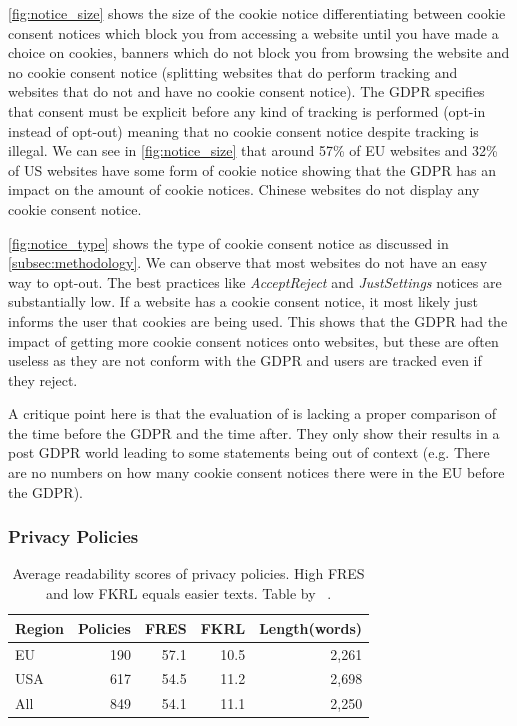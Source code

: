 \autoref{fig:notice_size} shows the size of the cookie notice differentiating between cookie consent notices which block
you from accessing a website until you have made a choice on cookies, banners which do not block you from browsing the
website and no cookie consent notice (splitting websites that do perform tracking and websites that do not and have no
cookie consent notice). The GDPR specifies that consent must be explicit before any kind of tracking is performed
(opt-in instead of opt-out) meaning that no cookie consent notice despite tracking is illegal.
We can see in \autoref{fig:notice_size} that around 57\% of EU websites and 32\% of US
websites have some form of cookie notice showing that the GDPR has an impact on the amount of cookie notices.
Chinese websites do not display any cookie consent notice.

\autoref{fig:notice_type} shows the type of cookie consent notice as discussed in \autoref{subsec:methodology}.
We can observe that most websites do not have an easy way to opt-out. The best practices like \emph{AcceptReject} and
\emph{JustSettings} notices are substantially low. If a website has a cookie consent notice, it
most likely just informs the user that cookies are being used. This shows that the GDPR had the impact of getting more
cookie consent notices onto websites, but these are often useless as they are not conform with the GDPR and users are
tracked even if they reject.

A critique point here is that the evaluation of  is lacking a proper comparison of the time before
the GDPR and the time after. They only show their results in a post GDPR world leading to some statements being out of
context (e.g. There are no numbers on how many cookie consent notices there were in the EU before the GDPR).

\subsubsection{Privacy Policies}

\begin{table}
    \begin{tabular}{ l r r r r }
        \hline
        Region & Policies & FRES & FKRL & Length(words) \\
        \hline
        EU & 190 & 57.1 & 10.5 & 2,261 \\
        USA & 617 & 54.5 & 11.2 & 2,698 \\
        All & 849 & 54.1 & 11.1 & 2,250 \\
        \hline
    \end{tabular}
    \caption{Average readability scores of privacy policies. High FRES and low FKRL equals easier texts. Table by
    \citeauthor{sanchez2019can}~\cite[Tab.~5]{sanchez2019can}.}
    \label{tab:policies}
\end{table}


